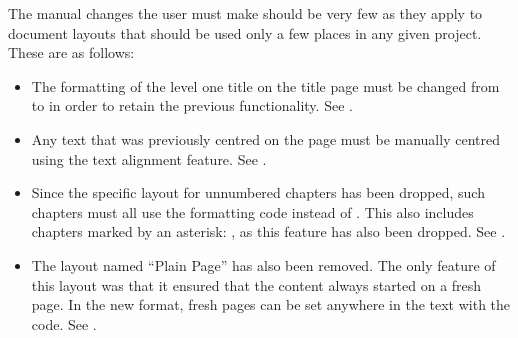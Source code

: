 \documentclass[a4paper,11pt,english]{sphinxmanual}
\begin{document}
\sphinxAtStartPar
The manual changes the user must make should be very few as they apply to document layouts that
should be used only a few places in any given project. These are as follows:

\sphinxAtStartPar
{}
\begin{itemize}
\item {} 
\sphinxAtStartPar
The formatting of the level one title on the title page must be changed from  to
 in order to retain the previous functionality. See {\hyperref[\detokenize{usage_format:a-fmt-head}]{}}.

\item {} 
\sphinxAtStartPar
Any text that was previously centred on the page must be manually centred using the text
alignment feature. See {\hyperref[\detokenize{usage_format:a-fmt-align}]{}}.

\end{itemize}

\sphinxAtStartPar
{}
\begin{itemize}
\item {} 
\sphinxAtStartPar
Since the specific layout for unnumbered chapters has been dropped, such chapters must all use
the  formatting code instead of . This also includes
chapters marked by an asterisk: , as this feature has also been dropped.
See {\hyperref[\detokenize{usage_format:a-fmt-head}]{}}.

\end{itemize}

\sphinxAtStartPar
{}
\begin{itemize}
\item {} 
\sphinxAtStartPar
The layout named “Plain Page” has also been removed. The only feature of this layout was that it
ensured that the content always started on a fresh page. In the new format, fresh pages can be
set anywhere in the text with the  code. See {\hyperref[\detokenize{usage_format:a-fmt-break}]{}}.

\end{itemize}
\end{document}
